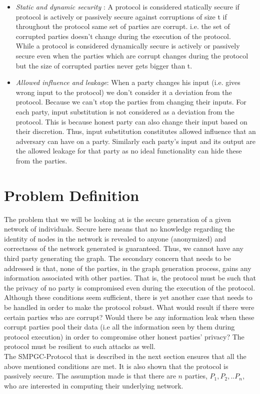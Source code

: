 \documentclass{llncs}
\begin{document}
\begin{itemize}
\item \emph{Static and dynamic security }: A protocol is considered statically secure if protocol is actively or passively secure against corruptions of size t if throughout the protocol same set of parties are corrupt. i.e. the set of corrupted parties doesn't change during the execution of the protocol.\\
While a protocol is considered dynamically secure is actively or passively secure even when the parties which are corrupt changes during the protocol but the size of corrupted parties never gets bigger than t.

\item \emph{Allowed influence and leakage}: When a party changes his input (i.e. gives wrong input to the protocol) we don't consider it a deviation from the protocol. Because we can't stop the parties from changing their inputs. For each party, input substitution is not considered as a deviation from the protocol. This is because honest party can also change their input based on their discretion. Thus, input substitution constitutes allowed influence that an adversary can have on a party. Similarly each party’s input and its output are the allowed leakage for that party as no ideal functionality can hide these from the parties.
\end{itemize}




\section{Problem Definition}
The problem that we will be looking at is the secure generation of a given network of individuals. Secure here means that no knowledge regarding the identity of nodes in the network is revealed to anyone (anonymized) and correctness of the network generated is guaranteed. Thus, we cannot have any third party generating the graph. %
 The secondary concern that needs to be addressed is that, none of the parties, in the graph generation process, gains any information associated with other parties. That is, the protocol must be such that the privacy of no party is compromised even during the execution of the protocol. Although these conditions seem sufficient, there is yet another case that needs to be handled in order to make the protocol robust. What would result if there were certain parties who are corrupt? Would there be any information leak when these corrupt parties pool their data (i.e all the information seen by them during protocol execution) in order to compromise other honest parties' privacy? The protocol must be resilient to such attacks as well.\\
The SMPGC-Protocol that is described in the next section ensures that all the above mentioned conditions are met. It is also shown that the protocol is passively secure. The assumption made is that there are $n$ parties, $P_1,P_2,..P_n$, who are interested in computing their underlying network. 
\end{document}
